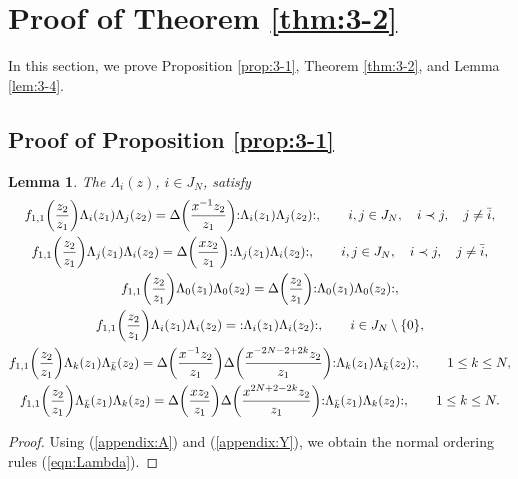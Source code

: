 \documentclass[pdftex]{sigma}
\numberwithin{equation}{section}
\newtheorem{Lemma}[Theorem]{Lemma}
\begin{document}
\section{Proof of Theorem \ref{thm:3-2}}
\label{section:4}

In this section, we prove
Proposition \ref{prop:3-1},
Theorem \ref{thm:3-2},
and Lemma \ref{lem:3-4}.

\subsection{Proof of Proposition \ref{prop:3-1}}

\begin{Lemma}
The $\Lambda_i(z)$, $i \in J_N$, satisfy
\begin{gather}
f_{1,1}\biggl(\frac{z_2}{z_1}\biggr)\Lambda_i(z_1)\Lambda_j(z_2)=
\Delta\biggl(\frac{x^{-1}z_2}{z_1}\biggr)
{:}\Lambda_i(z_1)\Lambda_j(z_2){:},\qquad
i,j \in J_N,\quad i \prec j,\quad j \neq \bar{i},\notag
\\
f_{1,1}\biggl(\frac{z_2}{z_1}\biggr)\Lambda_j(z_1)\Lambda_i(z_2)=
\Delta\biggl(\frac{x z_2}{z_1}\biggr){:}\Lambda_j(z_1)\Lambda_i(z_2){:},\qquad
{i,j \in J_N,\quad i \prec j,\quad j \neq \bar{i}},\notag
\\
f_{1,1}\biggl(\frac{z_2}{z_1}\biggr)\Lambda_0(z_1)\Lambda_0(z_2)=
\Delta\biggl(\frac{z_2}{z_1}\biggr){:}\Lambda_0(z_1)\Lambda_0(z_2){:},\notag
\\
f_{1,1}\biggl(\frac{z_2}{z_1}\biggr)\Lambda_i(z_1)\Lambda_i(z_2)=
{:}\Lambda_i(z_1)\Lambda_i(z_2){:},\qquad
i \in J_N\setminus \{0\},
\label{eqn:Lambda}
\\
f_{1,1}\biggl(\frac{z_2}{z_1}\biggr)\Lambda_k(z_1)\Lambda_{\bar{k}}(z_2)=
\Delta\biggl(\frac{x^{-1}z_2}{z_1}\biggr)
\Delta\biggl(\frac{x^{-2N-2+2k}z_2}{z_1}\biggr)
{:}\Lambda_k(z_1)\Lambda_{\bar{k}}(z_2){:},\qquad
1\leq k \leq N,
\notag
\\
f_{1,1}\biggl(\frac{z_2}{z_1}\biggr)\Lambda_{\bar{k}}(z_1)\Lambda_{k}(z_2)=
\Delta\biggl(\frac{xz_2}{z_1}\biggr)
\Delta\biggl(\frac{x^{2N+2-2k}z_2}{z_1}\biggr)
{:}\Lambda_{\bar{k}}(z_1)\Lambda_{k}(z_2){:},\qquad
1\leq k \leq N.
\notag
\end{gather}
\end{Lemma}

\begin{proof}
Using (\ref{appendix:A}) and (\ref{appendix:Y}),
we obtain the normal ordering rules (\ref{eqn:Lambda}).
\end{proof}
\end{document}
